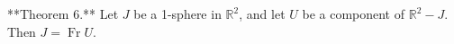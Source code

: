 **Theorem 6.** Let $J$ be a 1-sphere in $\mathbb{R}^2$, and let $U$ be a component of $\mathbb{R}^2 - J$. Then $J = \operatorname{Fr} U$.
